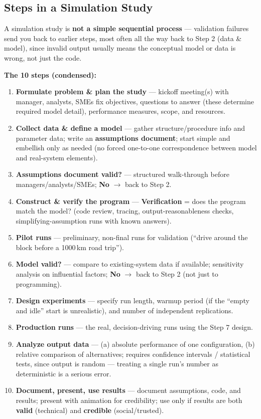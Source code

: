\subsection{Steps in a Simulation Study}

\begin{keypoint}
A simulation study is \textbf{not a simple sequential process} — validation failures send you back to earlier steps, most often all the way back to Step 2 (data \& model), since invalid output usually means the conceptual model or data is wrong, not just the code.
\end{keypoint}

\textbf{The 10 steps (condensed):}
\begin{enumerate}
\item \textbf{Formulate problem \& plan the study} — kickoff meeting(s) with manager, analysts, SMEs fix objectives, questions to answer (these determine required model detail), performance measures, scope, and resources.
\item \textbf{Collect data \& define a model} — gather structure/procedure info and parameter data; write an \textbf{assumptions document}; start simple and embellish only as needed (no forced one-to-one correspondence between model and real-system elements).
\item \textbf{Assumptions document valid?} — structured walk-through before managers/analysts/SMEs; \textbf{No} $\to$ back to Step 2.
\item \textbf{Construct \& verify the program} — \textbf{Verification} = does the program match the model? (code review, tracing, output-reasonableness checks, simplifying-assumption runs with known answers).
\item \textbf{Pilot runs} — preliminary, non-final runs for validation (``drive around the block before a 1000\,km road trip'').
\item \textbf{Model valid?} — compare to existing-system data if available; sensitivity analysis on influential factors; \textbf{No} $\to$ back to Step 2 (not just to programming).
\item \textbf{Design experiments} — specify run length, warmup period (if the ``empty and idle'' start is unrealistic), and number of independent replications.
\item \textbf{Production runs} — the real, decision-driving runs using the Step 7 design.
\item \textbf{Analyze output data} — (a) absolute performance of one configuration, (b) relative comparison of alternatives; requires confidence intervals / statistical tests, since output is random — treating a single run's number as deterministic is a serious error.
\item \textbf{Document, present, use results} — document assumptions, code, and results; present with animation for credibility; use only if results are both \textbf{valid} (technical) and \textbf{credible} (social/trusted).
\end{enumerate}

